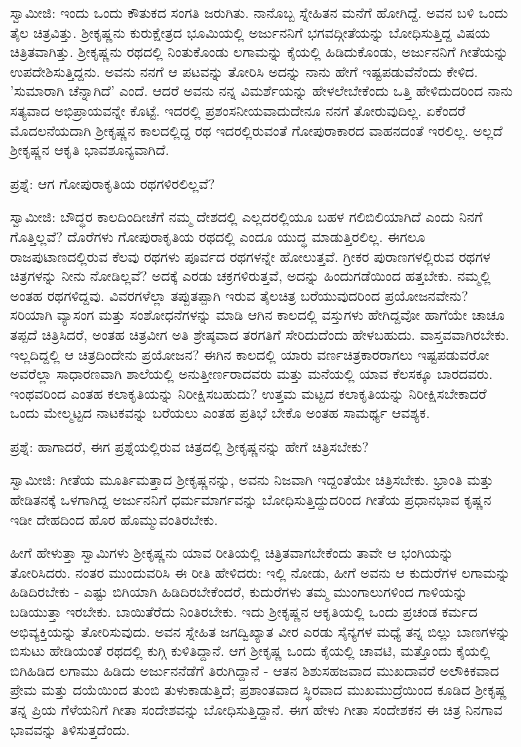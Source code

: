 ಸ್ವಾಮೀಜಿ: ಇಂದು ಒಂದು ಕೌತುಕದ ಸಂಗತಿ ಜರುಗಿತು. ನಾನೊಬ್ಬ ಸ್ನೇಹಿತನ ಮನೆಗೆ ಹೋಗಿದ್ದೆ. ಅವನ ಬಳಿ ಒಂದು ತೈಲ ಚಿತ್ರವಿತ್ತು. ಶ‍್ರೀಕೃಷ್ಣನು ಕುರುಕ್ಷೇತ್ರದ ಭೂಮಿಯಲ್ಲಿ ಅರ್ಜುನನಿಗೆ ಭಗವದ್ಗೀತೆಯನ್ನು ಬೋಧಿಸುತ್ತಿದ್ದ ವಿಷಯ ಚಿತ್ರಿತವಾಗಿತ್ತು. ಶ‍್ರೀಕೃಷ್ಣನು ರಥದಲ್ಲಿ ನಿಂತುಕೊಂಡು ಲಗಾಮನ್ನು ಕೈಯಲ್ಲಿ ಹಿಡಿದುಕೊಂಡು, ಅರ್ಜುನನಿಗೆ ಗೀತೆಯನ್ನು ಉಪದೇಶಿಸುತ್ತಿದ್ದನು. ಅವನು ನನಗೆ ಆ ಪಟವನ್ನು ತೋರಿಸಿ ಅದನ್ನು ನಾನು ಹೇಗೆ ಇಷ್ಟಪಡುವೆನೆಂದು ಕೇಳಿದ. 'ಸುಮಾರಾಗಿ ಚೆನ್ನಾಗಿದೆ' ಎಂದೆ. ಆದರೆ ಅವನು ನನ್ನ ವಿಮರ್ಶೆಯನ್ನು ಹೇಳಲೇಬೇಕೆಂದು ಒತ್ತಿ ಹೇಳಿದುದರಿಂದ ನಾನು ಸತ್ಯವಾದ ಅಭಿಪ್ರಾಯವನ್ನೇ ಕೊಟ್ಟೆ. ಇದರಲ್ಲಿ ಪ್ರಶಂಸನೀಯವಾದುದೇನೂ ನನಗೆ ತೋರುವುದಿಲ್ಲ. ಏಕೆಂದರೆ ಮೊದಲನೆಯದಾಗಿ ಶ‍್ರೀಕೃಷ್ಣನ ಕಾಲದಲ್ಲಿದ್ದ ರಥ ಇದರಲ್ಲಿರುವಂತೆ ಗೋಪುರಾಕಾರದ ವಾಹನದಂತೆ ಇರಲಿಲ್ಲ. ಅಲ್ಲದೆ ಶ‍್ರೀಕೃಷ್ಣನ ಆಕೃತಿ ಭಾವಶೂನ್ಯವಾಗಿದೆ.

ಪ್ರಶ್ನೆ: ಆಗ ಗೋಪುರಾಕೃತಿಯ ರಥಗಳಿರಲಿಲ್ಲವೆ?

ಸ್ವಾಮೀಜಿ: ಬೌದ್ಧರ ಕಾಲದಿಂದೀಚೆಗೆ ನಮ್ಮ ದೇಶದಲ್ಲಿ ಎಲ್ಲದರಲ್ಲಿಯೂ ಬಹಳ ಗಲಿಬಿಲಿಯಾಗಿದೆ ಎಂದು ನಿನಗೆ ಗೊತ್ತಿಲ್ಲವೆ? ದೊರೆಗಳು ಗೋಪುರಾಕೃತಿಯ ರಥದಲ್ಲಿ ಎಂದೂ ಯುದ್ಧ ಮಾಡುತ್ತಿರಲಿಲ್ಲ. ಈಗಲೂ ರಾಜಪುಟಾಣದಲ್ಲಿರುವ ಕೆಲವು ರಥಗಳು ಪೂರ್ವದ ರಥಗಳನ್ನೇ ಹೋಲುತ್ತವೆ. ಗ್ರೀಕರ ಪುರಾಣಗಳಲ್ಲಿರುವ ರಥಗಳ ಚಿತ್ರಗಳನ್ನು ನೀನು ನೋಡಿಲ್ಲವೆ? ಅದಕ್ಕೆ ಎರಡು ಚಕ್ರಗಳಿರುತ್ತವೆ, ಅದನ್ನು ಹಿಂದುಗಡೆಯಿಂದ ಹತ್ತಬೇಕು. ನಮ್ಮಲ್ಲಿ ಅಂತಹ ರಥಗಳಿದ್ದವು. ವಿವರಗಳೆಲ್ಲಾ ತಪ್ಪುತಪ್ಪಾಗಿ ಇರುವ ತೈಲಚಿತ್ರ ಬರೆಯುವುದರಿಂದ ಪ್ರಯೋಜನವೇನು? ಸರಿಯಾಗಿ ವ್ಯಾಸಂಗ ಮತ್ತು ಸಂಶೋಧನೆಗಳನ್ನು ಮಾಡಿ ಆಗಿನ ಕಾಲದಲ್ಲಿ ವಸ್ತುಗಳು ಹೇಗಿದ್ದವೋ ಹಾಗೆಯೇ ಚಾಚೂ ತಪ್ಪದೆ ಚಿತ್ರಿಸಿದರೆ, ಅಂತಹ ಚಿತ್ರವೀಗ ಅತಿ ಶ್ರೇಷ್ಠವಾದ ತರಗತಿಗೆ ಸೇರಿದುದೆಂದು ಹೇಳಬಹುದು. ವಾಸ್ತವವಾಗಿರಬೇಕು. ಇಲ್ಲದಿದ್ದಲ್ಲಿ ಆ ಚಿತ್ರದಿಂದೇನು ಪ್ರಯೋಜನ? ಈಗಿನ ಕಾಲದಲ್ಲಿ ಯಾರು ವರ್ಣಚಿತ್ರಕಾರರಾಗಲು ಇಷ್ಟಪಡುವರೋ ಅವರೆಲ್ಲಾ ಸಾಧಾರಣವಾಗಿ ಶಾಲೆಯಲ್ಲಿ ಅನುತ್ತೀರ್ಣರಾದವರು ಮತ್ತು ಮನೆಯಲ್ಲಿ ಯಾವ ಕೆಲಸಕ್ಕೂ ಬಾರದವರು. ಇಂಥವರಿಂದ ಎಂತಹ ಕಲಾಕೃತಿಯನ್ನು ನಿರೀಕ್ಷಿಸಬಹುದು? ಉತ್ತಮ ಮಟ್ಟದ ಕಲಾಕೃತಿಯನ್ನು ನಿರೀಕ್ಷಿಸಬೇಕಾದರೆ ಒಂದು ಮೇಲ್ಮಟ್ಟದ ನಾಟಕವನ್ನು ಬರೆಯಲು ಎಂತಹ ಪ್ರತಿಭೆ ಬೇಕೊ ಅಂತಹ ಸಾಮರ್ಥ್ಯ ಆವಶ್ಯಕ.

ಪ್ರಶ್ನೆ: ಹಾಗಾದರೆ, ಈಗ ಪ್ರಶ್ನೆಯಲ್ಲಿರುವ ಚಿತ್ರದಲ್ಲಿ ಶ‍್ರೀಕೃಷ್ಣನನ್ನು ಹೇಗೆ ಚಿತ್ರಿಸಬೇಕು?

ಸ್ವಾಮೀಜಿ: ಗೀತೆಯ ಮೂರ್ತಿಮತ್ತಾದ ಶ‍್ರೀಕೃಷ್ಣನನ್ನು, ಅವನು ನಿಜವಾಗಿ ಇದ್ದಂತೆಯೇ ಚಿತ್ರಿಸಬೇಕು. ಭ್ರಾಂತಿ ಮತ್ತು ಹೇಡಿತನಕ್ಕೆ ಒಳಗಾಗಿದ್ದ ಅರ್ಜುನನಿಗೆ ಧರ್ಮಮಾರ್ಗವನ್ನು ಬೋಧಿಸುತ್ತಿದ್ದುದರಿಂದ ಗೀತೆಯ ಪ್ರಧಾನಭಾವ ಕೃಷ್ಣನ ಇಡೀ ದೇಹದಿಂದ ಹೊರ ಹೊಮ್ಮುವಂತಿರಬೇಕು.

ಹೀಗೆ ಹೇಳುತ್ತಾ ಸ್ವಾಮಿಗಳು ಶ‍್ರೀಕೃಷ್ಣನು ಯಾವ ರೀತಿಯಲ್ಲಿ ಚಿತ್ರಿತವಾಗಬೇಕೆಂದು ತಾವೇ ಆ ಭಂಗಿಯನ್ನು ತೋರಿಸಿದರು. ನಂತರ ಮುಂದುವರಿಸಿ ಈ ರೀತಿ ಹೇಳಿದರು: ಇಲ್ಲಿ ನೋಡು, ಹೀಗೆ ಅವನು ಆ ಕುದುರೆಗಳ ಲಗಾಮನ್ನು ಹಿಡಿದಿರಬೇಕು - ಎಷ್ಟು ಬಿಗಿಯಾಗಿ ಹಿಡಿದಿರಬೇಕೆಂದರೆ, ಕುದುರೆಗಳು ತಮ್ಮ ಮುಂಗಾಲುಗಳಿಂದ ಗಾಳಿಯನ್ನು ಬಡಿಯುತ್ತಾ ಇರಬೇಕು. ಬಾಯಿತೆರೆದು ನಿಂತಿರಬೇಕು. ಇದು ಶ‍್ರೀಕೃಷ್ಣನ ಆಕೃತಿಯಲ್ಲಿ ಒಂದು ಪ್ರಚಂಡ ಕರ್ಮದ ಅಭಿವ್ಯಕ್ತಿಯನ್ನು ತೋರಿಸುವುದು. ಅವನ ಸ್ನೇಹಿತ ಜಗದ್ವಿಖ್ಯಾತ ವೀರ ಎರಡು ಸೈನ್ಯಗಳ ಮಧ್ಯೆ ತನ್ನ ಬಿಲ್ಲು ಬಾಣಗಳನ್ನು ಬಿಸುಟು ಹೇಡಿಯಂತೆ ರಥದಲ್ಲಿ ಕುಗ್ಗಿ ಕುಳಿತಿದ್ದಾನೆ. ಆಗ ಶ‍್ರೀಕೃಷ್ಣ ಒಂದು ಕೈಯಲ್ಲಿ ಚಾವಟಿ, ಮತ್ತೊಂದು ಕೈಯಲ್ಲಿ ಬಿಗಿಹಿಡಿದ ಲಗಾಮು ಹಿಡಿದು ಅರ್ಜುನನೆಡೆಗೆ ತಿರುಗಿದ್ದಾನೆ - ಆತನ ಶಿಶುಸಹಜವಾದ ಮುಖದಾವರೆ ಅಲೌಕಿಕವಾದ ಪ್ರೇಮ ಮತ್ತು ದಯೆಯಿಂದ ತುಂಬಿ ತುಳುಕಾಡುತ್ತಿದೆ; ಪ್ರಶಾಂತವಾದ ಸ್ಥಿರವಾದ ಮುಖಮುದ್ರೆಯಿಂದ ಕೂಡಿದ ಶ‍್ರೀಕೃಷ್ಣ ತನ್ನ ಪ್ರಿಯ ಗೆಳೆಯನಿಗೆ ಗೀತಾ ಸಂದೇಶವನ್ನು ಬೋಧಿಸುತ್ತಿದ್ದಾನೆ. ಈಗ ಹೇಳು ಗೀತಾ ಸಂದೇಶಕನ ಈ ಚಿತ್ರ ನಿನಗಾವ ಭಾವವನ್ನು ತಿಳಿಸುತ್ತದೆಂದು.

